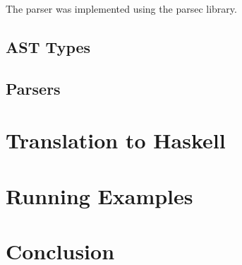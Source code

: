 \documentclass{article}
\def\H{Haskell}
\begin{document}
The parser was implemented using the parsec library.

\subsection{AST Types}

\subsection{Parsers}

\section{Translation to \H}

\section{Running Examples}

\section{Conclusion}
\end{document}
